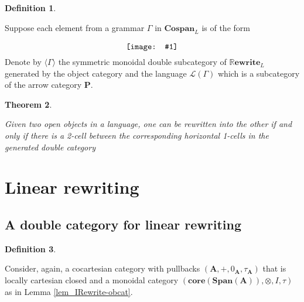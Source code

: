 \documentclass{amsart}
\newcommand{\A}{\cat{A}}
\renewcommand{\P}{\cat{P}}
\newcommand{\core}{\mathbf{core}}
\newcommand{\cat}[1]{\mathbf{#1}}
\newcommand{\diagram}[1]{\raisebox{-0.5\height}{\texttt{[image: \#1]}}}
\newcommand{\Span}{\mathbf{Span}}
\newcommand{\Cospan}{\mathbf{Cospan}}
\newcommand{\RRewrite}{ \mathbb{R}\mathbf{ewrite} }
\newtheorem{theorem}{Theorem}[section]
\theoremstyle{remark}
\theoremstyle{definition}
\newtheorem{definition}[theorem]{Definition}
\begin{document}
\begin{definition}
  \label{df:nl_gramr-gen-dblcat}
	
  Suppose each element from a grammar $ \Gamma $ in $ \Cospan_{L} $ is
  of the form
  \[
    \diagram{diag_nlr-grammar-2cell}
  \]
  Denote by $ \langle \Gamma \rangle $ the symmetric monoidal double
  subcategory of $ \RRewrite_{L} $ generated by the object category
  and the language $ \mathcal{L} ( \Gamma ) $ which is a subcategory
  of the arrow category $ \P $.
        
\end{definition}

\begin{theorem}
  \label{thm:nl_rewr-iff-2cell}
  
  Given two open objects in a language, one can be rewritten into the
  other if and only if there is a 2-cell between the corresponding
  horizontal 1-cells in the generated double category
  
\end{theorem}



\section{Linear rewriting} \label{sec:linear-rewriting}





\subsection{A double category for linear rewriting}
\label{sec:dble-cat-linr-rewr}


\begin{definition}
  \label{def:mon-rewrite-obcat}
 
  Consider, again, a cocartesian category with pullbacks
  $ (\A , + , 0_{\A} , \tau_\A ) $
  that is locally cartesian closed and a monoidal category
  $ ( \core ( \Span ( \A )) , \otimes , I , \tau )$
  as in Lemma \ref{lem_IRewrite-obcat}.
  
\end{definition}
\end{document}
